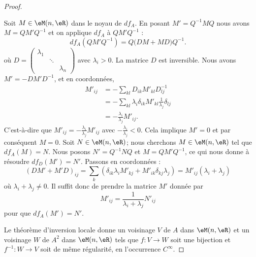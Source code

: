 \begin{proof}
	\begin{subproof}
		Soit \( M\in \eM(n,\eR)\) dans le noyau de \( df_A\). En posant \( M'=Q^{-1}MQ\) nous avons \( M=QM'Q^{-1}\) et on applique \( df_A\) à \( QM'Q^{-1}\) :
		\begin{equation}
			df_A(QM'Q^{-1})=Q\big( DM+MD \big)Q^{-1}.
		\end{equation}
		où \( D=\begin{pmatrix}
			\lambda_1 &        &           \\
			          & \ddots &           \\
			          &        & \lambda_n
		\end{pmatrix}\) avec \( \lambda_i>0\). La matrice \( D\) est inversible. Nous avons \( M'=-DM'D^{-1}\), et en coordonnées,
		\begin{subequations}
			\begin{align}
				M'_{ij} & = -\sum_{kl}D_{ik}M'_{kl}D^{-1}_{lj}                                    \\
				        & = -\sum_{kl}\lambda_i\delta_{ik}M'_{kl}\frac{1}{ \lambda_j }\delta_{lj} \\
				        & = -\frac{ \lambda_i }{ \lambda_j }M'_{ij}.
			\end{align}
		\end{subequations}
		C'est-à-dire que \( M'_{ij}=-\frac{ \lambda_i }{ \lambda_j }M'_{ij}\) avec \( -\frac{ \lambda_i }{ \lambda_j }<0\). Cela implique \( M'=0\) et par conséquent \( M=0\).
		Soit \( N\in \eM(n,\eR)\); nous cherchons \( M\in \eM(n,\eR)\) tel que \( df_A(M)=N\). Nous posons \( N'=Q^{-1} NQ\) et \( M=QM'Q^{-1}\), ce qui nous donne à résoudre \( df_D(M')=N'\). Passons en coordonnées :
		\begin{equation}
			(DM'+M'D)_{ij}=\sum_k(\delta_{ik}\lambda_iM'_{kj}+M'_{ik}\delta_{kj}\lambda_j)=M'_{ij}(\lambda_i+\lambda_j)
		\end{equation}
		où \( \lambda_i+\lambda_j\neq 0\). Il suffit donc de prendre la matrice \( M'\) donnée par
		\begin{equation}
			M'_{ij}=\frac{1}{ \lambda_i+\lambda_j }N'_{ij}
		\end{equation}
		pour que \( df_A(M')=N'\).
	\end{subproof}

	Le théorème d'inversion locale donne un voisinage \( V\) de \( A\) dans \( \eM(n,\eR)\) et un voisinage \( W\) de \( A^2\) dans \( \eM(n,\eR)\) tels que \( f\colon V\to W\) soit une bijection  et \( f^{-1}\colon W\to V\) soit de même régularité, en l'occurrence \( C^{\infty}\).
\end{proof}

